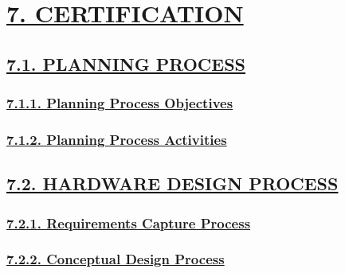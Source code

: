 \documentclass[
]{article}
\begin{document}
\hypertarget{certification}{%
\section{\texorpdfstring{\protect\hyperlink{certification-1}{7.
CERTIFICATION}}{7. CERTIFICATION}}\label{certification}}

\hypertarget{planning-process}{%
\subsection{\texorpdfstring{\protect\hyperlink{planning-process-1}{7.1.
PLANNING PROCESS}}{7.1. PLANNING PROCESS}}\label{planning-process}}

\hypertarget{planning-process-objectives}{%
\subsubsection{\texorpdfstring{\protect\hyperlink{planning-process-objectives-1}{7.1.1.
Planning Process
Objectives}}{7.1.1. Planning Process Objectives}}\label{planning-process-objectives}}

\hypertarget{planning-process-activities}{%
\subsubsection{\texorpdfstring{\protect\hyperlink{planning-process-activities-1}{7.1.2.
Planning Process
Activities}}{7.1.2. Planning Process Activities}}\label{planning-process-activities}}

\hypertarget{hardware-design-process}{%
\subsection{\texorpdfstring{\protect\hyperlink{hardware-design-process-1}{7.2.
HARDWARE DESIGN
PROCESS}}{7.2. HARDWARE DESIGN PROCESS}}\label{hardware-design-process}}

\hypertarget{requirements-capture-process}{%
\subsubsection{\texorpdfstring{\protect\hyperlink{requirements-capture-process-1}{7.2.1.
Requirements Capture
Process}}{7.2.1. Requirements Capture Process}}\label{requirements-capture-process}}

\hypertarget{conceptual-design-process}{%
\subsubsection{\texorpdfstring{\protect\hyperlink{conceptual-design-process-1}{7.2.2.
Conceptual Design
Process}}{7.2.2. Conceptual Design Process}}\label{conceptual-design-process}}
\end{document}
